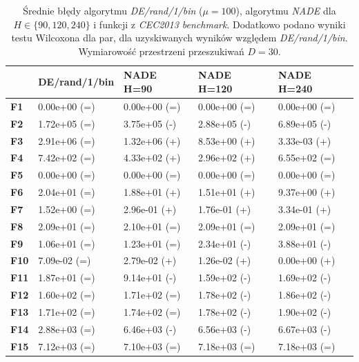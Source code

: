 \documentclass[12pt,a4paper]{report}
\begin{document}
{{{{{{\begin{table}[]
\centering
\caption{Średnie błędy algorytmu \emph{DE/rand/1/bin} ($\mu = 100$), algorytmu \emph{NADE} dla $H \in \{90, 120, 240\}$ i funkcji z \emph{CEC2013 benchmark}. Dodatkowo podano wyniki testu Wilcoxona dla par, dla uzyskiwanych wyników względem \emph{DE/rand/1/bin}. Wymiarowość przestrzeni przeszukiwań $D = 30$.}
\label{Eksp130}
\begin{tabular}{|l|l|l|l|l|}
\hline
          & {\bf DE/rand/1/bin} & {\bf NADE H=90} & {\bf NADE H=120} & {\bf NADE H=240} \\ \hline
{\bf F1}  & 0.00e+00 (=)        & 0.00e+00 (=)    & 0.00e+00 (=)     & 0.00e+00 (=)     \\ \hline
{\bf F2}  & 1.72e+05 (=)        & 3.75e+05 (-)    & 2.88e+05 (-)     & 6.89e+05 (-)     \\ \hline
{\bf F3}  & 2.91e+06 (=)        & 1.32e+06 (+)    & 8.53e+00 (+)     & 3.33e-03 (+)     \\ \hline
{\bf F4}  & 7.42e+02 (=)        & 4.33e+02 (+)    & 2.96e+02 (+)     & 6.55e+02 (=)     \\ \hline
{\bf F5}  & 0.00e+00 (=)        & 0.00e+00 (=)    & 0.00e+00 (=)     & 0.00e+00 (=)     \\ \hline
{\bf F6}  & 2.04e+01 (=)        & 1.88e+01 (+)    & 1.51e+01 (+)     & 9.37e+00 (+)     \\ \hline
{\bf F7}  & 1.52e+00 (=)        & 2.96e-01 (+)    & 1.76e-01 (+)     & 3.34e-01 (+)     \\ \hline
{\bf F8}  & 2.09e+01 (=)        & 2.10e+01 (=)    & 2.09e+01 (=)     & 2.09e+01 (=)     \\ \hline
{\bf F9}  & 1.06e+01 (=)        & 1.23e+01 (=)    & 2.34e+01 (-)     & 3.88e+01 (-)     \\ \hline
{\bf F10} & 7.09e-02 (=)        & 2.79e-02 (+)    & 1.26e-02 (+)     & 0.00e+00 (+)     \\ \hline
{\bf F11} & 1.87e+01 (=)        & 9.14e+01 (-)    & 1.59e+02 (-)     & 1.69e+02 (-)     \\ \hline
{\bf F12} & 1.60e+02 (=)        & 1.71e+02 (=)    & 1.78e+02 (-)     & 1.86e+02 (-)     \\ \hline
{\bf F13} & 1.71e+02 (=)        & 1.74e+02 (=)    & 1.78e+02 (-)     & 1.90e+02 (-)     \\ \hline
{\bf F14} & 2.88e+03 (=)        & 6.46e+03 (-)    & 6.56e+03 (-)     & 6.67e+03 (-)     \\ \hline
{\bf F15} & 7.12e+03 (=)        & 7.10e+03 (=)    & 7.18e+03 (=)     & 7.18e+03 (=)     \\ \hline

\end{tabular}
\end{table}}}}}}}
\end{document}
